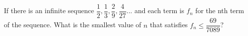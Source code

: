 If there is an infinite sequence $\dfrac{1}{2}, \dfrac{1}{3}, \dfrac{2}{9}, \dfrac{4}{27} ...$ and each term is $f_n$ for the nth term of the sequence. What is the smallest value of $n$ that satisfies $f_n \leq \dfrac{69}{7089}$?
